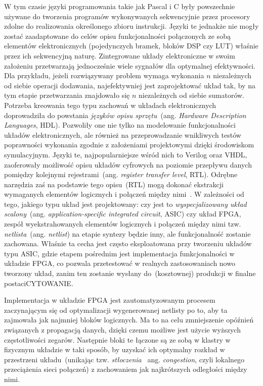 W tym czasie języki programowania takie jak Pascal i C były powszechnie używane do tworzenia programów wykonywanych sekwencyjnie przez procesory zdolne do realizowania określonego zbioru instrukcji. Języki te jednakże nie mogły zostać zaadaptowane do celów opisu funkcjonalności połączonych ze sobą elementów elektronicznych (pojedynczych bramek, bloków DSP czy LUT) właśnie przez ich sekwencyjną naturę. Zintegrowane układy elektroniczne w swoim założeniu przetwarzają jednocześnie wiele sygnałów dla optymalnej efektywności. Dla przykładu, jeżeli rozwiązywany problem wymaga wykonania $n$ niezależnych od siebie operacji dodawania, najefektywniej jest zaprojektować układ tak, by na tym etapie przetwarzania znajdowało się $n$ niezależnych od siebie sumatorów. Potrzeba kreowania tego typu zachowań w układach elektronicznych doprowadziła do powstania \textit{języków opisu sprzętu}~(ang. \textit{Hardware Description Languages}, HDL). Pozwoliły one nie tylko na modelowanie funkcjonalności układów elektronicznych, ale również na przeprowadzanie wnikliwych testów poprawności wykonania zgodnie z założeniami projektowymi dzięki środowiskom symulacyjnym. Języki te, najpopularniejsze wśród nich to Verilog oraz VHDL, zaoferowały możliwość opisu układów cyfrowych na poziomie przepływu danych pomiędzy kolejnymi rejestrami~(ang. \textit{register transfer level}, RTL). Odrębne narzędzia zaś na podstawie tego opisu~(RTL) mogą dokonać ekstrakcji wymaganych elementów logicznych i połączeń między nimi~\cite{VERILOG_BIBLE}. W zależności od tego, jakiego typu układ jest projektowany: czy jest to \textit{wyspecjalizowany układ scalony}~(ang. \textit{application-specific integrated circuit}, ASIC) czy układ FPGA, zespół wyekstrahowanych elementów logicznych i połączeń między nimi tzw. \textit{netlista}~(ang. \textit{netlist}) na etapie syntezy będzie inny, ale funkcjonalność zostanie zachowana. Właśnie ta cecha jest często eksploatowana przy tworzeniu układów typu ASIC, gdzie etapem pośrednim jest implementacja funkcjonalności w układzie FPGA, co pozwala przetestować w realnych zastosowaniach nowo tworzony układ, zanim ten zostanie wysłany do~(kosztownej) produkcji w finalne postaci{\color{red}CYTOWANIE}. 

Implementacja w układzie FPGA jest zautomatyzowanym procesem zaczynającym się od optymalizacji wygenerowanej netlisty po to, aby ta zajmowała jak najmniej bloków logicznych. Ma to na celu zmniejszenie opóźnień związanych z propagacją danych, dzięki czemu możliwe jest użycie wyższych częstotliwości zegarów. Następnie bloki te łączone są ze sobą w klastry w fizycznym układzie w taki sposób, by uzyskać ich optymalny rozkład w przestrzeni układu~(unikając tzw. \textit{stłoczenia}~ ang. \textit{congestion}, czyli lokalnego przeciążenia sieci połączeń) z zachowaniem jak najkrótszych odległości między nimi. 

